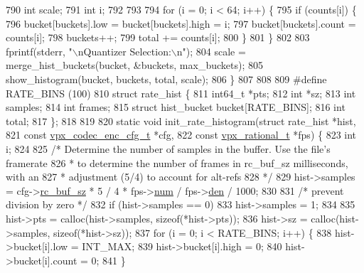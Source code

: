 \begin{DoxyCodeInclude}
{{{{{{{{{{{{{{{{{{{{{{{{{{790   \textcolor{keywordtype}{int} scale;
791   \textcolor{keywordtype}{int} i;
792 
793 
794   \textcolor{keywordflow}{for} (i = 0; i < 64; i++) \{
795     \textcolor{keywordflow}{if} (counts[i]) \{
796       bucket[buckets].low = bucket[buckets].high = i;
797       bucket[buckets].count = counts[i];
798       buckets++;
799       total += counts[i];
800     \}
801   \}
802 
803   fprintf(stderr, \textcolor{stringliteral}{"\(\backslash\)nQuantizer Selection:\(\backslash\)n"});
804   scale = merge\_hist\_buckets(bucket, &buckets, max\_buckets);
805   show\_histogram(bucket, buckets, total, scale);
806 \}
807 
808 
809 \textcolor{preprocessor}{#define RATE\_BINS (100)}
810 \textcolor{keyword}{struct }rate\_hist \{
811   int64\_t            *pts;
812   \textcolor{keywordtype}{int}                *sz;
813   \textcolor{keywordtype}{int}                 samples;
814   \textcolor{keywordtype}{int}                 frames;
815   \textcolor{keyword}{struct }hist\_bucket  bucket[RATE\_BINS];
816   \textcolor{keywordtype}{int}                 total;
817 \};
818 
819 
820 \textcolor{keyword}{static} \textcolor{keywordtype}{void} init\_rate\_histogram(\textcolor{keyword}{struct} rate\_hist          *hist,
821                                 \textcolor{keyword}{const} \hyperlink{structvpx__codec__enc__cfg}{vpx\_codec\_enc\_cfg\_t} *cfg,
822                                 \textcolor{keyword}{const} \hyperlink{structvpx__rational}{vpx\_rational\_t}      *fps) \{
823   \textcolor{keywordtype}{int} i;
824 
825   \textcolor{comment}{/* Determine the number of samples in the buffer. Use the file's framerate}
826 \textcolor{comment}{   * to determine the number of frames in rc\_buf\_sz milliseconds, with an}
827 \textcolor{comment}{   * adjustment (5/4) to account for alt-refs}
828 \textcolor{comment}{   */}
829   hist->samples = cfg->\hyperlink{structvpx__codec__enc__cfg_a61866272bb588cd86d28834f420430f0}{rc\_buf\_sz} * 5 / 4 * fps->\hyperlink{structvpx__rational_ae7774f21a22c9bef3aa73156c79f4731}{num} / fps->\hyperlink{structvpx__rational_a29dd2ab4001377b3aa21885ef969759f}{den} / 1000;
830 
831   \textcolor{comment}{/* prevent division by zero */}
832   \textcolor{keywordflow}{if} (hist->samples == 0)
833     hist->samples = 1;
834 
835   hist->pts = calloc(hist->samples, \textcolor{keyword}{sizeof}(*hist->pts));
836   hist->sz = calloc(hist->samples, \textcolor{keyword}{sizeof}(*hist->sz));
837   \textcolor{keywordflow}{for} (i = 0; i < RATE\_BINS; i++) \{
838     hist->bucket[i].low = INT\_MAX;
839     hist->bucket[i].high = 0;
840     hist->bucket[i].count = 0;
841   \}
}}}}}}}}}}}}}}}}}}}}}}}}}}
\end{DoxyCodeInclude}
